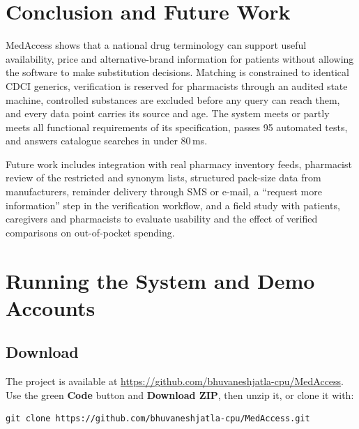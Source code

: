 \documentclass[11pt,a4paper]{article}
\newcommand{\repolink}{\url{https://github.com/bhuvaneshjatla-cpu/MedAccess}}
\begin{document}
\section{Conclusion and Future Work}\label{ch:concl}
MedAccess shows that a national drug terminology can support useful availability, price and alternative-brand information for patients without allowing the software to make substitution decisions. Matching is constrained to identical CDCI generics, verification is reserved for pharmacists through an audited state machine, controlled substances are excluded before any query can reach them, and every data point carries its source and age. The system meets or partly meets all functional requirements of its specification, passes 95 automated tests, and answers catalogue searches in under 80\,ms.

Future work includes integration with real pharmacy inventory feeds, pharmacist review of the restricted and synonym lists, structured pack-size data from manufacturers, reminder delivery through SMS or e-mail, a ``request more information'' step in the verification workflow, and a field study with patients, caregivers and pharmacists to evaluate usability and the effect of verified comparisons on out-of-pocket spending.

\appendix
\section{Running the System and Demo Accounts}\label{app:run}

\subsection{Download}
The project is available at \repolink{}. Use the green \textbf{Code} button and \textbf{Download ZIP}, then unzip it, or clone it with:
\begin{verbatim}
git clone https://github.com/bhuvaneshjatla-cpu/MedAccess.git
\end{verbatim}
\end{document}

